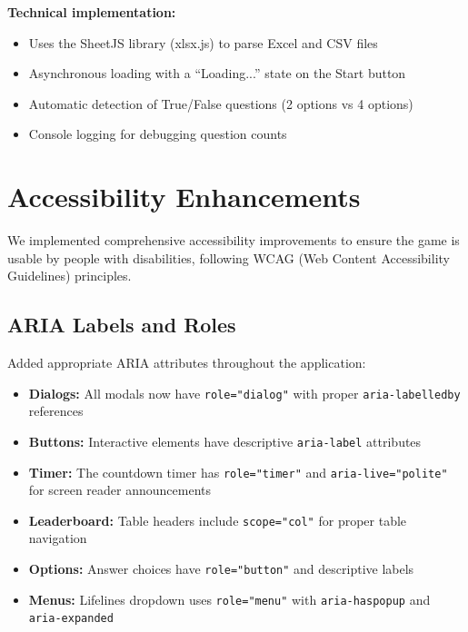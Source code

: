 \documentclass[11pt,a4paper]{article}
\begin{document}
\textbf{Technical implementation:}
\begin{itemize}
    \item Uses the SheetJS library (xlsx.js) to parse Excel and CSV files
    \item Asynchronous loading with a ``Loading...'' state on the Start button
    \item Automatic detection of True/False questions (2 options vs 4 options)
    \item Console logging for debugging question counts
\end{itemize}

\section{Accessibility Enhancements}

We implemented comprehensive accessibility improvements to ensure the game is usable by people with disabilities, following WCAG (Web Content Accessibility Guidelines) principles.

\subsection{ARIA Labels and Roles}

Added appropriate ARIA attributes throughout the application:

\begin{itemize}
    \item \textbf{Dialogs:} All modals now have \texttt{role="dialog"} with proper \texttt{aria-labelledby} references
    \item \textbf{Buttons:} Interactive elements have descriptive \texttt{aria-label} attributes
    \item \textbf{Timer:} The countdown timer has \texttt{role="timer"} and \texttt{aria-live="polite"} for screen reader announcements
    \item \textbf{Leaderboard:} Table headers include \texttt{scope="col"} for proper table navigation
    \item \textbf{Options:} Answer choices have \texttt{role="button"} and descriptive labels
    \item \textbf{Menus:} Lifelines dropdown uses \texttt{role="menu"} with \texttt{aria-haspopup} and \texttt{aria-expanded}
\end{itemize}
\end{document}
